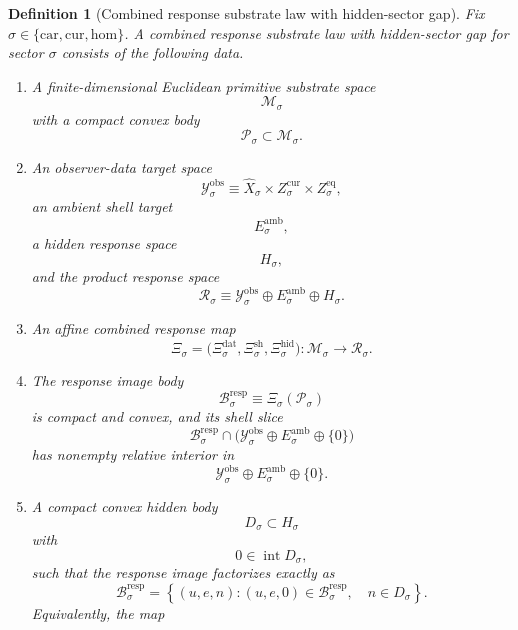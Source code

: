 \documentclass[11pt]{article}
\newcommand{\Car}{\mathrm{car}}
\newcommand{\Cur}{\mathrm{cur}}
\newcommand{\Hom}{\mathrm{hom}}
\newcommand{\VisibleAffine}[1]{\widehat X_{#1}}
\newcommand{\DataSpace}[1]{\mathcal Y_{#1}^{\mathrm{obs}}}
\newcommand{\AmbientTarget}[1]{E_{#1}^{\mathrm{amb}}}
\newcommand{\ProtoSpace}[1]{\mathcal M_{#1}}
\newcommand{\ProtoBody}[1]{\mathcal P_{#1}}
\newcommand{\ResponseSpace}[1]{\mathcal R_{#1}}
\newcommand{\ResponseMap}[1]{\Xi_{#1}}
\newcommand{\ResponseData}[1]{\Xi_{#1}^{\mathrm{dat}}}
\newcommand{\ResponseShell}[1]{\Xi_{#1}^{\mathrm{sh}}}
\newcommand{\ResponseHidden}[1]{\Xi_{#1}^{\mathrm{hid}}}
\newcommand{\ResponseImage}[1]{\mathcal B_{#1}^{\mathrm{resp}}}
\newcommand{\GapSpace}[1]{H_{#1}}
\newcommand{\GapBody}[1]{D_{#1}}
\newtheorem{definition}{Definition}
\begin{document}
\begin{definition}[Combined response substrate law with hidden-sector gap]
\label{def:combined}
Fix \(\sigma\in\{\Car,\Cur,\Hom\}\). A \emph{combined response substrate law with hidden-sector gap} for sector \(\sigma\) consists of the following data.
\begin{enumerate}
    \item A finite-dimensional Euclidean primitive substrate space
    \[
    \ProtoSpace{\sigma}
    \]
    with a compact convex body
    \[
    \ProtoBody{\sigma}\subset \ProtoSpace{\sigma}.
    \]
    \item An observer-data target space
    \[
    \DataSpace{\sigma}
    \equiv
    \VisibleAffine{\sigma}\times Z_{\sigma}^{\mathrm{cur}}\times Z_{\sigma}^{\mathrm{eq}},
    \]
    an ambient shell target
    \[
    \AmbientTarget{\sigma},
    \]
    a hidden response space
    \[
    \GapSpace{\sigma},
    \]
    and the product response space
    \[
    \ResponseSpace{\sigma}
    \equiv
    \DataSpace{\sigma}\oplus \AmbientTarget{\sigma}\oplus \GapSpace{\sigma}.
    \]
    \item An affine combined response map
    \[
    \ResponseMap{\sigma}
    =
    \bigl(
    \ResponseData{\sigma},
    \ResponseShell{\sigma},
    \ResponseHidden{\sigma}
    \bigr):
    \ProtoSpace{\sigma}\to \ResponseSpace{\sigma}.
    \]
    \item The response image body
    \begin{equation}
    \ResponseImage{\sigma}
    \equiv
    \ResponseMap{\sigma}(\ProtoBody{\sigma})
    \label{eq:imagebody}
    \end{equation}
    is compact and convex, and its shell slice
    \[
    \ResponseImage{\sigma}\cap
    \bigl(
    \DataSpace{\sigma}\oplus \AmbientTarget{\sigma}\oplus\{0\}
    \bigr)
    \]
    has nonempty relative interior in
    \[
    \DataSpace{\sigma}\oplus \AmbientTarget{\sigma}\oplus\{0\}.
    \]
    \item A compact convex hidden body
    \[
    \GapBody{\sigma}\subset \GapSpace{\sigma}
    \]
    with
    \[
    0\in\operatorname{int}\GapBody{\sigma},
    \]
    such that the response image factorizes exactly as
    \begin{equation}
    \ResponseImage{\sigma}
    =
    \left\{
    (u,e,n):
    (u,e,0)\in\ResponseImage{\sigma},
    \quad
    n\in\GapBody{\sigma}
    \right\}.
    \label{eq:responsefactor}
    \end{equation}
    Equivalently, the map
    \begin{equation}

\end{equation}
\end{enumerate}
\end{definition}
\end{document}
